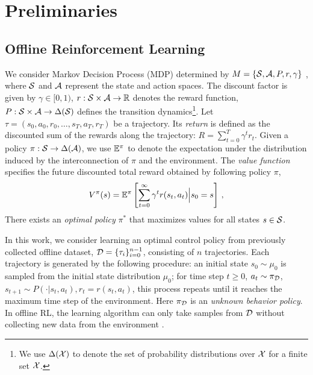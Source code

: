 


\section{Preliminaries}

\subsection{Offline Reinforcement Learning}

We consider Markov Decision Process (MDP) determined by $M=\{{\mathcal{S}}, {\mathcal{A}}, P, r, \gamma\}$ \citep{puterman2014markov}, 
where ${\mathcal{S}}$ and ${\mathcal{A}}$ represent the state and action spaces. The discount factor
is given by $\gamma\in[0, 1)$, 
$r:{\mathcal{S}}\times{\mathcal{A}}\rightarrow {\mathbb{R}}$ denotes the reward function,  
$P:{\mathcal{S}}\times{\mathcal{A}}\rightarrow \Delta({\mathcal{S}})$ defines the transition dynamics\footnote{We use $\Delta({\mathcal{X}})$ to denote the set of probability distributions over ${\mathcal{X}}$ for a finite set ${\mathcal{X}}$.}. 
Let $\tau=(s_0, a_0, r_0, \dots, s_T, a_T, r_T)$ be a trajectory. Its \emph{return} is defined as the discounted sum of the rewards along the trajectory: $R = \sum_{t=0}^{T} \gamma^{t} r_{t}$. 
Given a policy $\pi:{\mathcal{S}}\rightarrow \Delta({\mathcal{A}})$, we use $\mathbb{E}^\pi$ to denote the expectation under the distribution induced by the interconnection of $\pi$ and the environment.  
The \emph{value function} specifies the future discounted total reward obtained by following policy $\pi$, 
\begin{align}
V^\pi(s) = \mathbb{E}^\pi\left[ \sum_{t=0}^\infty \gamma^t r(s_t, a_t) \Big| s_0 = s\right]\, ,
\end{align}
There exists an \emph{optimal policy} $\pi^*$ that maximizes values for all states $s\in{\mathcal{S}}$. 

In this work, we consider learning an optimal control policy from previously collected offline dataset, $\mathcal{D} = \{ \tau_i \}^{n-1}_{i=0}$, consisting of $n$ trajectories.  
Each trajectory is generated by the following procedure:
an initial state $s_0\sim\mu_0$ is sampled from the initial state distribution $\mu_0$; for time step $t\geq 0$, $a_t\sim \pi_{{\mathcal{D}}}$, $s_{t+1} \sim P(\cdot|s_t, a_t), r_t=r(s_t, a_t)$, this process repeats until it reaches the maximum time step of the environment. Here $\pi_{\mathcal{D}}$ is an \emph{unknown behavior policy}.  
In offline RL, 
the learning algorithm can only take samples from $\mathcal{D}$ without collecting new data from the environment \citep{levine2020offline}.  

\iffalse
The \emph{in-sample optimal value function} considers the optimal value constrained to the dataset \citep{fujimoto2018addressing,kostrikov2022offline,xiaosample}, 
\begin{align}
V^*_{\cD}(s) = \max_{a: \pi_{\cD}(a | s) > 0} r(s,a) + \gamma \EE_{s'\sim P(\cdot | s,a)} \left[ V^*_{\cD} (s') \right]\, , 
\label{eq:in-sample-v}
\end{align}
Intuitively, one can view the offline dataset $\cD$ as an {empirical MDP}, which only contains transitions sampled from the behavior policy.  $V^*_{\cD}$ defines the optimal value of this empirical MDP. \citet{kostrikov2022offline} and \citet{xiaosample} propose algorithms for learning this value. 
\fi


